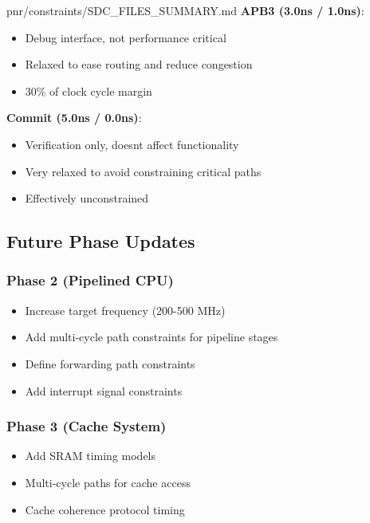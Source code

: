 \begin{relocated}{pnr/constraints/SDC_FILES_SUMMARY.md}
\textbf{APB3 (3.0ns / 1.0ns)}:

\begin{itemize}
\tightlist
\item
  Debug interface, not performance critical
\item
  Relaxed to ease routing and reduce congestion
\item
  30\% of clock cycle margin
\end{itemize}

\textbf{Commit (5.0ns / 0.0ns)}:

\begin{itemize}
\tightlist
\item
  Verification only, doesn\textquotesingle t affect functionality
\item
  Very relaxed to avoid constraining critical paths
\item
  Effectively unconstrained
\end{itemize}

\subsection{Future Phase Updates}\label{tm:pd:constraints-sdc-files-summary:future-phase-updates}

\subsubsection{Phase 2 (Pipelined CPU)}\label{tm:pd:constraints-sdc-files-summary:phase-2-pipelined-cpu}

\begin{itemize}
\tightlist
\item
  Increase target frequency (200-500 MHz)
\item
  Add multi-cycle path constraints for pipeline stages
\item
  Define forwarding path constraints
\item
  Add interrupt signal constraints
\end{itemize}

\subsubsection{Phase 3 (Cache System)}\label{tm:pd:constraints-sdc-files-summary:phase-3-cache-system}

\begin{itemize}
\tightlist
\item
  Add SRAM timing models
\item
  Multi-cycle paths for cache access
\item
  Cache coherence protocol timing
\end{itemize}


\end{relocated}
